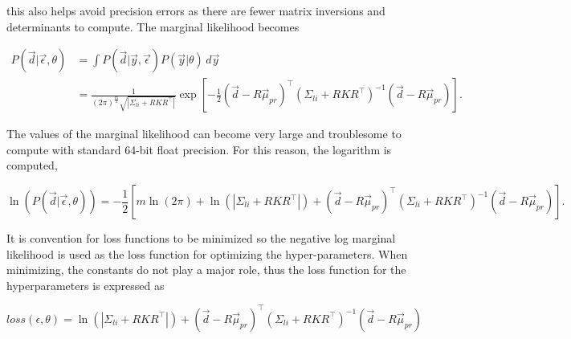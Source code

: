 \noindent this also helps avoid precision errors as there are fewer matrix inversions and determinants to compute. The marginal likelihood becomes

\begin{equation}
\begin{aligned}
 P(\vec d|\vec\epsilon,\theta) &= \int P(\vec{d}|\vec{y},\vec\epsilon)P(\vec{y}|\theta)  \, d\vec y \\
 &= \frac{1}{(2\pi)^{\frac{m}{2}} \sqrt{|\Sigma_{li} + RKR^\top|}} \exp\left[ -\frac{1}{2} (\vec{d} - R\vec{\mu}_{pr})^{\top} (\Sigma_{li} + R K R^{\top})^{-1} (\vec{d} - R\vec{\mu}_{pr}) \right].
\end{aligned}
\end{equation}

\noindent The values of the marginal likelihood can become very large and troublesome to compute with standard 64-bit float precision. For this reason, the logarithm is computed,

\begin{equation}
\ln(P(\vec d| \vec \epsilon,\theta)) = -\frac{1}{2} \left[m\ln(2\pi ) + \ln(|\Sigma_{li}+RKR^\top|) +  (\vec{d} - R\vec{\mu}_{pr})^{\top} (\Sigma_{li} + R K R^{\top})^{-1} (\vec{d} - R\vec{\mu}_{pr})\right]. 
\end{equation}

\noindent It is convention for loss functions to be minimized so the negative log marginal likelihood is used as the loss function for optimizing the hyper-parameters. When minimizing, the constants do not play a major role, thus the loss function for the hyperparameters is expressed as

\begin{equation}
loss(\epsilon, \theta) = \ln(|\Sigma_{li}+RKR^\top|) +  (\vec{d} - R\vec{\mu}_{pr})^{\top} (\Sigma_{li} + R K R^{\top})^{-1} (\vec{d} - R\vec{\mu}_{pr})
\end{equation}